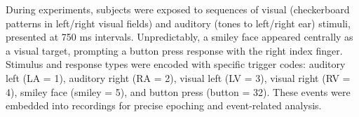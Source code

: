 

\noindent During experiments, subjects were exposed to sequences of visual (checkerboard patterns in left/right visual fields) and auditory (tones to left/right ear) stimuli, presented at 750 ms intervals. Unpredictably, a smiley face appeared centrally as a visual target, prompting a button press response with the right index finger. Stimulus and response types were encoded with specific trigger codes: auditory left (LA = 1), auditory right (RA = 2), visual left (LV = 3), visual right (RV = 4), smiley face (smiley = 5), and button press (button = 32). These events were embedded into recordings for precise epoching and event-related analysis.\\



